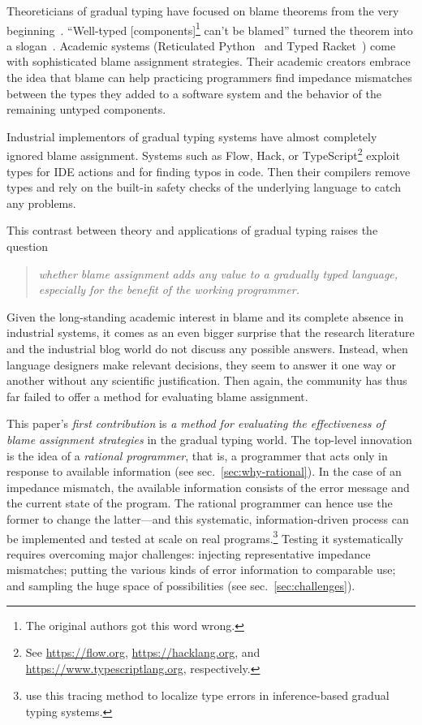 
Theoreticians of gradual typing have focused on blame theorems from the very
beginning~\cite{mf-toplas-2009, tf-dls-2006}. ``Well-typed
[components]\footnote{The original authors got this word wrong.} can't be
blamed'' turned the theorem into a slogan~\cite{wf-esop-2009}. Academic systems
(Reticulated Python~\cite{vsc-dls-2019, vss-popl-2017, vksb-dls-2014} and Typed
Racket~\cite{tf-dls-2006,tf-popl-2008,tfffgksst-snapl-2017,tf-icfp-2010}) come
with sophisticated blame assignment strategies. Their academic creators embrace
the idea that blame can help practicing programmers find impedance mismatches
between the types they added to a software system and the behavior of the
remaining untyped components.

Industrial implementors of gradual typing systems have almost
completely ignored blame assignment.  Systems such as Flow, Hack, or
TypeScript\footnote{See \url{https://flow.org},
\url{https://hacklang.org}, and \url{https://www.typescriptlang.org},
respectively.} exploit types for IDE actions and for finding typos in
code. Then their compilers remove types and rely on the built-in
safety checks of the underlying language to catch any problems.

This contrast between theory and applications of gradual typing raises the question 
\begin{quote}
 \it
 whether blame assignment adds any value to a gradually typed language,
 especially for the benefit of the working programmer.
\end{quote}
Given the long-standing academic interest in blame and its complete absence in
industrial systems, it comes as an even bigger surprise that the research
literature and the industrial blog world do not discuss any possible answers.
Instead, when language designers make relevant decisions, they seem to answer it
one way or another without any scientific justification. Then again, the
community has thus far failed to offer a method for evaluating blame assignment.

This paper's {\em first contribution\/} is {\em a method for evaluating the
effectiveness of blame assignment strategies\/} in the gradual typing world.
The top-level innovation is the idea of a {\em rational programmer\/}, that is,
a programmer that acts only in response to available information (see
sec.~\ref{sec:why-rational}). In the case of an impedance mismatch, the
available information consists of the error message and the current state of the
program. The rational programmer can hence use the former to change the
latter---and this systematic, information-driven process can be
implemented and tested at scale on real programs.\footnote{\citet{cc-snapl-19} use this tracing method to localize
type errors in inference-based gradual typing systems.}  Testing it systematically requires
overcoming major challenges: injecting representative impedance mismatches;
putting the various kinds of error information to comparable use; and sampling
the huge space of possibilities (see sec.~\ref{sec:challenges}).

